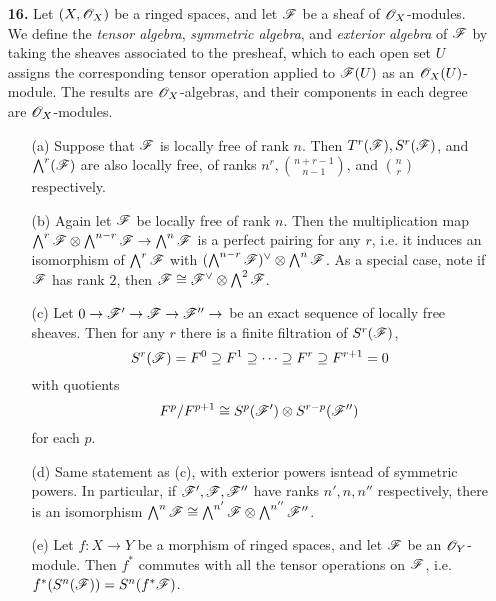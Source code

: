 \documentclass{article}
\begin{document}
\begin{enumerate} [label=\textbf{\arabic*.}, leftmargin=0em]
\item[\textbf{16.}] Let $(X, \mathscr{O}_X)$ be a ringed spaces, and let $\mathscr{F}$ be a sheaf of $\mathscr{O}_X$-modules. We define the \textit{tensor algebra}, \textit{symmetric algebra}, and \textit{exterior algebra} of $\mathscr{F}$ by taking the sheaves associated to the presheaf, which to each open set $U$ assigns the corresponding tensor operation applied to $\mathscr{F}(U)$ as an $\mathscr{O}_X(U)$-module. The results are $\mathscr{O}_X$-algebras, and their components in each degree are $\mathscr{O}_X$-modules.
\begin{itemize}
    \item[(a)] Suppose that $\mathscr{F}$ is locally free of rank $n$. Then $T^r(\mathscr{F}), S^r(\mathscr{F})$, and $\bigwedge^r(\mathscr{F})$ are also locally free, of ranks $n^r, {n + r - 1 \choose n - 1}$, and ${n \choose r}$ respectively.
    \item[(b)] Again let $\mathscr{F}$ be locally free of rank $n$. Then the multiplication map $\bigwedge^r \mathscr{F} \otimes \bigwedge^{n - r} \mathscr{F} \to \bigwedge^n \mathscr{F}$ is a perfect pairing for any $r$, i.e. it induces an isomorphism of $\bigwedge^r \mathscr{F}$ with $(\bigwedge^{n - r} \mathscr{F})^\vee \otimes \bigwedge^n \mathscr{F}$. As a special case, note if $\mathscr{F}$ has rank $2$, then $\mathscr{F} \cong \mathscr{F}^\vee \otimes \bigwedge^2 \mathscr{F}$.
    \item[(c)] Let $0 \to \mathscr{F}' \to \mathscr{F} \to \mathscr{F}'' \to $ be an exact sequence of locally free sheaves. Then for any $r$ there is a finite filtration of $S^r(\mathscr{F})$,
    \begin{equation*}
        S^r(\mathscr{F}) = F^0 \supseteq F^1 \supseteq \cdots \supseteq F^r \supseteq F^{r + 1} = 0
    \end{equation*}
    with quotients
    \begin{equation*}
        F^p / F^{p + 1} \cong S^p(\mathscr{F}') \otimes S^{r - p}(\mathscr{F}'')
    \end{equation*}
    for each $p$.
    \item[(d)] Same statement as (c), with exterior powers isntead of symmetric powers. In particular, if $\mathscr{F}', \mathscr{F}, \mathscr{F}''$ have ranks $n', n, n''$ respectively, there is an isomorphism $\bigwedge^n \mathscr{F} \cong \bigwedge^{n'} \mathscr{F} \otimes \bigwedge^{n''} \mathscr{F}''$.
    \item[(e)] Let $f : X \to Y$ be a morphism of ringed spaces, and let $\mathscr{F}$ be an $\mathscr{O}_Y$-module. Then $f^*$ commutes with all the tensor operations on $\mathscr{F}$, i.e. $f^*(S^n(\mathscr{F})) = S^n(f^* \mathscr{F})$.
\end{itemize}


\end{enumerate}
\end{document}
